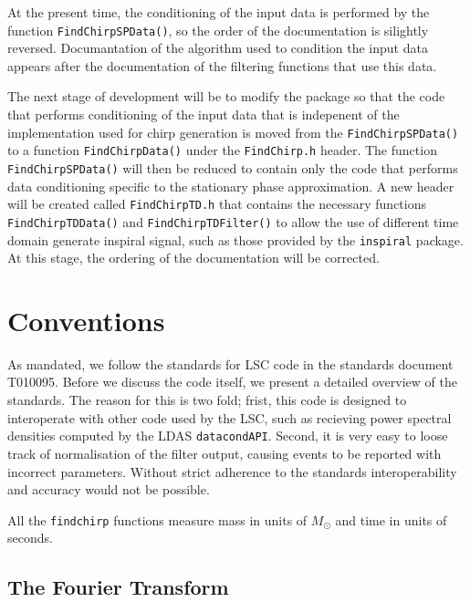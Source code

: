 At the present time, the conditioning of the input data is performed by the
function \texttt{FindChirpSPData()}, so the order of the documentation is
silightly reversed. Documantation of the algorithm used to condition the input
data appears after the documentation of the filtering functions that use this
data.

The next stage of development will be to modify the package so that the code
that performs conditioning of the input data that is indepenent of the
implementation used for chirp generation is moved from the
\texttt{FindChirpSPData()} to a function \texttt{FindChirpData()} under the
\texttt{FindChirp.h} header. The function \texttt{FindChirpSPData()} will then
be reduced to contain only the code that performs data conditioning specific
to the stationary phase approximation. A new header will be created called
\texttt{FindChirpTD.h} that contains the necessary functions
\texttt{FindChirpTDData()} and \texttt{FindChirpTDFilter()} to allow the use
of different time domain generate inspiral signal, such as those provided by
the \texttt{inspiral} package. At this stage, the ordering of the
documentation will be corrected.
\newpage

\section{Conventions}

As mandated, we follow the standards for LSC code in the standards
document T010095. Before we discuss the code itself, we present a detailed
overview of the standards. The reason for this is two fold; frist, this code is
designed to interoperate with other code used by the LSC, such as recieving
power spectral densities computed by the LDAS \texttt{datacondAPI}. Second, it
is very easy to loose track of normalisation of the filter output, causing
events to be reported with incorrect parameters. Without strict adherence to
the standards interoperability and accuracy would not be possible.

All the \texttt{findchirp} functions measure mass in units of $M_\odot$ 
and time in units of seconds.

\subsection{The Fourier Transform}

